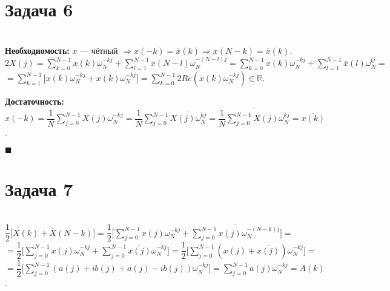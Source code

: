 \documentclass{article}
\title{}
\author{
	Дерюгин Денис, студент 561-й учебной группы
}
\date{\today}
\newcommand\proofend{\begin{flushright}$\blacksquare$\end{flushright}}
\begin{document}
\maketitle
\large{
	\section*{Задача 6} ~\\


	\textbf{Необходиомость:} $x$ --- чётный $\Rightarrow x(-k) = \overline{x}(k) \Rightarrow x(N - k) = \overline{x}(k)$.\\
	$2X(j) = \sum\limits_{k = 0}^{N - 1} x(k) \omega_N^{-kj} + \sum\limits_{l = 1}^{N - 1} x(N - l) \omega_N^{-(N - l)j} = \sum\limits_{k = 0}^{N - 1} x(k) \omega_N^{-kj} + \sum\limits_{l = 1}^{N - 1} \overline{x}(l) \omega_N^{lj} = $\\
	$= \sum\limits_{k = 1}^{N - 1} \bigg [ x(k) \omega_N^{-kj} + \overline{x(k) \omega_N^{-kj}} \bigg ] = \sum\limits_{k = 0}^{N - 1} 2Re(x(k) \omega_N^{-kj}) \in \mathbb{R}$.


	\textbf{Достаточность:} $x(-k) = \dfrac{1}{N} \sum\limits_{j = 0}^{N - 1} X(j) \omega_N^{-kj} = \dfrac{1}{N} \sum\limits_{j = 0}^{N - 1} \overline{X(j) \omega_N^{kj}} = \overline{\dfrac{1}{N} \sum\limits_{j = 0}^{N - 1} X(j) \omega_N^{kj}} = \overline{x(k)}$.

	\proofend






\section*{Задача 7} ~\\
	$\dfrac{1}{2} \big [ X(k) + \overline{X}(N - k) \big ] = \dfrac{1}{2} \big [ \sum\limits_{j = 0}^{N - 1} x(j) \omega_N^{-kj} + \overline{\sum\limits_{j = 0}^{N - 1} x(j) \omega_N^{-(N - k)j}}\big ] = $\\
	$= \dfrac{1}{2} \big [ \sum\limits_{j = 0}^{N - 1} x(j) \omega_N^{-kj} + \sum\limits_{j = 0}^{N - 1} \overline{x(j)} \omega_N^{-kj}\big ] = \dfrac{1}{2} \big [ \sum\limits_{j = 0}^{N - 1} (x(j) + \overline{x(j)}) \omega_N^{-kj}\big ] =$\\
	$= \dfrac{1}{2} \big [ \sum\limits_{j = 0}^{N - 1} (a(j) + ib(j) + a(j) - ib(j)) \omega_N^{-kj}\big ] = \sum\limits_{j = 0}^{N - 1} a(j) \omega_N^{-kj} = A(k)$.\\ \\ \\



}
\end{document}
